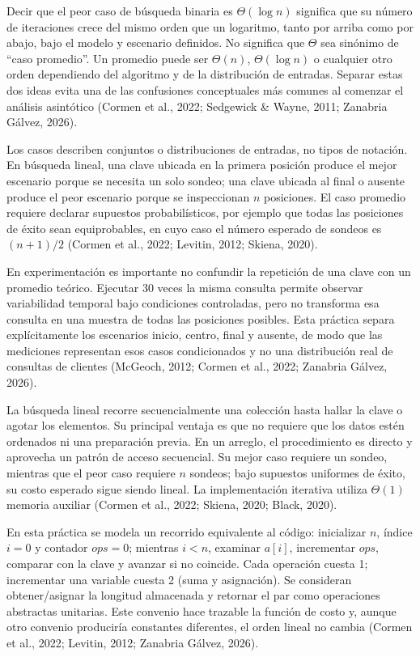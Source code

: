 Decir que el peor caso de búsqueda binaria es $\Theta(\log n)$ significa que su número de iteraciones crece del mismo orden que un logaritmo, tanto por arriba como por abajo, bajo el modelo y escenario definidos. No significa que $\Theta$ sea sinónimo de ``caso promedio''. Un promedio puede ser $\Theta(n)$, $\Theta(\log n)$ o cualquier otro orden dependiendo del algoritmo y de la distribución de entradas. Separar estas dos ideas evita una de las confusiones conceptuales más comunes al comenzar el análisis asintótico (Cormen et al., 2022; Sedgewick \& Wayne, 2011; Zanabria Gálvez, 2026).

Los casos describen conjuntos o distribuciones de entradas, no tipos de notación. En búsqueda lineal, una clave ubicada en la primera posición produce el mejor escenario porque se necesita un solo sondeo; una clave ubicada al final o ausente produce el peor escenario porque se inspeccionan $n$ posiciones. El caso promedio requiere declarar supuestos probabilísticos, por ejemplo que todas las posiciones de éxito sean equiprobables, en cuyo caso el número esperado de sondeos es $(n+1)/2$ (Cormen et al., 2022; Levitin, 2012; Skiena, 2020).

En experimentación es importante no confundir la repetición de una clave con un promedio teórico. Ejecutar 30 veces la misma consulta permite observar variabilidad temporal bajo condiciones controladas, pero no transforma esa consulta en una muestra de todas las posiciones posibles. Esta práctica separa explícitamente los escenarios inicio, centro, final y ausente, de modo que las mediciones representan esos casos condicionados y no una distribución real de consultas de clientes (McGeoch, 2012; Cormen et al., 2022; Zanabria Gálvez, 2026).

La búsqueda lineal recorre secuencialmente una colección hasta hallar la clave o agotar los elementos. Su principal ventaja es que no requiere que los datos estén ordenados ni una preparación previa. En un arreglo, el procedimiento es directo y aprovecha un patrón de acceso secuencial. Su mejor caso requiere un sondeo, mientras que el peor caso requiere $n$ sondeos; bajo supuestos uniformes de éxito, su costo esperado sigue siendo lineal. La implementación iterativa utiliza $\Theta(1)$ memoria auxiliar (Cormen et al., 2022; Skiena, 2020; Black, 2020).

En esta práctica se modela un recorrido equivalente al código: inicializar $n$, índice $i=0$ y contador $ops=0$; mientras $i<n$, examinar $a[i]$, incrementar $ops$, comparar con la clave y avanzar si no coincide. Cada operación cuesta 1; incrementar una variable cuesta 2 (suma y asignación). Se consideran obtener/asignar la longitud almacenada y retornar el par como operaciones abstractas unitarias. Este convenio hace trazable la función de costo y, aunque otro convenio produciría constantes diferentes, el orden lineal no cambia (Cormen et al., 2022; Levitin, 2012; Zanabria Gálvez, 2026).

